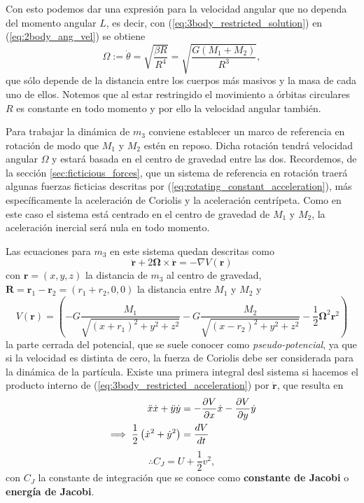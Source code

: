 Con esto podemos dar una expresión para la velocidad angular que no dependa del momento angular $L$, es decir, con (\ref{eq:3body_restricted_solution}) en (\ref{eq:2body_ang_vel}) se obtiene
\begin{equation}
 \Omega := \dot{\theta} = \sqrt{ \frac{\beta R}{R^4} } = \sqrt{\frac{G \left(M_1 + M_2 \right)}{R^3}},
 \label{eq:3body_ang_velocity}
\end{equation}
que sólo depende de la distancia entre los cuerpos más masivos y la masa de cada uno de ellos. Notemos que al estar restringido el movimiento a órbitas circulares $R$ es constante en todo momento y por ello la velocidad angular también.

Para trabajar la dinámica de $m_3$ conviene establecer un marco de referencia en rotación de modo que $M_1$ y $M_2$ estén en reposo. Dicha rotación tendrá velocidad angular $\Omega$ y estará basada en el centro de gravedad entre las dos. Recordemos, de la sección \ref{sec:ficticious_forces}, que un sistema de referencia en rotación traerá algunas fuerzas ficticias descritas por (\ref{eq:rotating_constant_acceleration}), más específicamente la aceleración de Coriolis y la aceleración centrípeta. Como en este caso el sistema está centrado en el centro de gravedad de $M_1$ y $M_2$, la aceleración inercial será nula en todo momento.

Las ecuaciones para $m_3$ en este sistema quedan descritas como
\begin{equation}
 \ddot{\mathbf{r}} + 2\mathbf{\Omega} \times \dot{\mathbf{r}} = - \nabla V(\mathbf{r})
 \label{eq:3body_restricted_acceleration}
\end{equation}
con $\mathbf{r} = (x,y,z)$ la distancia de $m_3$ al centro de gravedad, $\mathbf{R} = \mathbf{r}_1 - \mathbf{r}_2 = (r_1 + r_2,0,0)$ la distancia entre $M_1$ y $M_2$ y
\begin{equation}
 V(\mathbf{r}) = \left( -G \frac{M_1}{\sqrt{(x + r_1)^2 + y^2 + z^2}} - G \frac{M_2}{\sqrt{(x - r_2)^2 + y^2 + z^2}} - \frac{1}{2} \mathbf{\Omega}^2 \mathbf{r}^2 \right)
 \label{eq:3body_restricted_potential}
\end{equation} 
la parte cerrada del potencial, que se suele conocer como \textit{pseudo-potencial}, ya que si la velocidad es distinta de cero, la fuerza de Coriolis debe ser considerada para la dinámica de la partícula.
Existe una primera integral desl sistema si hacemos el producto interno de (\ref{eq:3body_restricted_acceleration}) por $\dot{\mathbf{r}}$, que resulta en 
\begin{align*}
 \ddot{x} \dot{x} + \ddot{y} \dot{y} &= - \frac{\partial V}{\partial x}\dot{x} - \frac{\partial V}{\partial y} \dot{y} \\
 \implies \frac{1}{2} \left( \dot{x}^2 + \dot{y}^2 \right) &= \frac{d V}{dt} 
\end{align*}
\begin{equation}
 \therefore C_J = U + \frac{1}{2}v^2,
 \label{eq:3body_jacobi_constant}
\end{equation}
con $C_J$ la constante de integración que se conoce como \textbf{constante de Jacobi} o \textbf{energía de Jacobi}.

